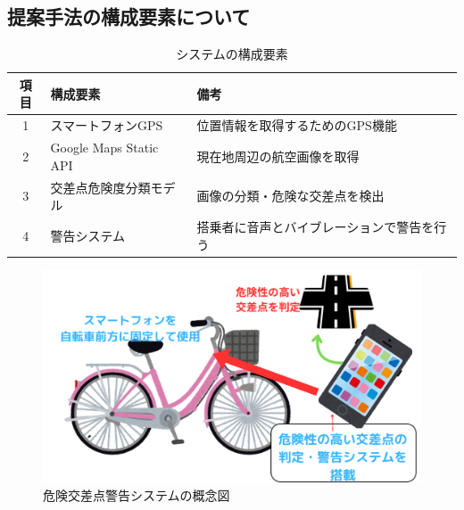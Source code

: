 \documentclass[uplatex,dvipdfmx]{jsarticle}
\begin{document}

\subsection{提案手法の構成要素について}

\begin{table}[H]
  \centering
  \caption{システムの構成要素}
  \label{tab:system_components}
  \begin{tabular}{|c|l|l|}
    \hline
    項目 & 構成要素 & 備考\\ \hline
    1 & スマートフォンGPS & 位置情報を取得するためのGPS機能 \\ \hline
    2 & Google Maps Static API & 現在地周辺の航空画像を取得 \\ \hline
    3 & 交差点危険度分類モデル & 画像の分類・危険な交差点を検出 \\ \hline
    4 & 警告システム & 搭乗者に音声とバイブレーションで警告を行う \\ \hline
  \end{tabular}
\end{table}

\begin{figure}[H]
  \centering
  \includegraphics[width=14cm]{./Figs/gainenzu_final.png}
  \caption{危険交差点警告システムの概念図}
  \label{fig:idea}
\end{figure}

\vspace{0.75cm}
\end{document}
